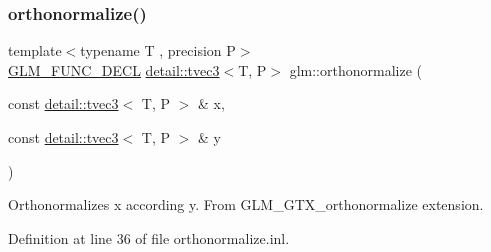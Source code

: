 \subsubsection{\texorpdfstring{orthonormalize()}{orthonormalize()}\hspace{0.1cm}{\footnotesize\ttfamily [2/2]}}
{\footnotesize\ttfamily template$<$typename T , precision P$>$ \\
\hyperlink{setup_8hpp_ab2d052de21a70539923e9bcbf6e83a51}{G\+L\+M\+\_\+\+F\+U\+N\+C\+\_\+\+D\+E\+CL} \hyperlink{structglm_1_1detail_1_1tvec3}{detail\+::tvec3}$<$T, P$>$ glm\+::orthonormalize (\begin{DoxyParamCaption}\item[{const \hyperlink{structglm_1_1detail_1_1tvec3}{detail\+::tvec3}$<$ T, P $>$ \&}]{x,  }\item[{const \hyperlink{structglm_1_1detail_1_1tvec3}{detail\+::tvec3}$<$ T, P $>$ \&}]{y }\end{DoxyParamCaption})}

Orthonormalizes x according y. From G\+L\+M\+\_\+\+G\+T\+X\+\_\+orthonormalize extension. 

Definition at line 36 of file orthonormalize.\+inl.

